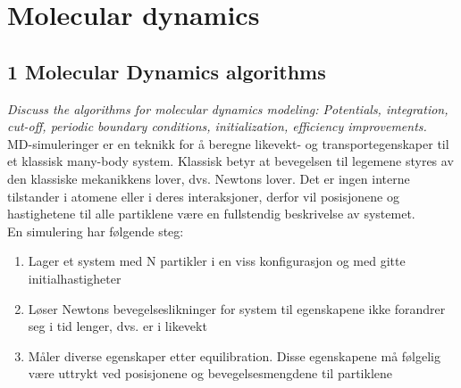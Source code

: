 \documentclass[english, a4paper]{article}
\begin{document}
\section{Molecular dynamics}

\subsection{1 Molecular Dynamics algorithms}
\textit{Discuss the algorithms for molecular dynamics modeling: Potentials, integration,
cut-off, periodic boundary conditions, initialization, efficiency improvements.} \\

\noindent
MD-simuleringer er en teknikk for å beregne likevekt- og transportegenskaper til et 
klassisk many-body system. Klassisk betyr at bevegelsen til legemene styres av den klassiske mekanikkens
lover, dvs. Newtons lover. Det er ingen interne tilstander i atomene eller i deres interaksjoner, derfor
vil posisjonene og hastighetene til alle partiklene være en fullstendig beskrivelse av systemet. \\

\noindent
En simulering har følgende steg:
\begin{enumerate}
 \item Lager et system med N partikler i en viss konfigurasjon og med gitte initialhastigheter
 \item Løser Newtons bevegelseslikninger for system til egenskapene ikke forandrer seg i tid lenger, 
 dvs. er i likevekt
 \item Måler diverse egenskaper etter equilibration. Disse egenskapene må følgelig være uttrykt
 ved posisjonene og bevegelsesmengdene til partiklene
\end{enumerate}
\end{document}
